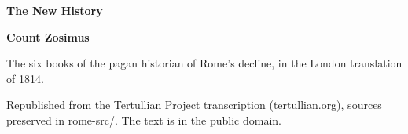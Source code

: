 \documentclass[11pt,letterpaper]{article}
\begin{document}
\color{ink}

\begin{titlepage}
\centering
\vspace*{4em}
{\LARGE\bfseries\color{heading} The New History\par}
\vspace{2em}
{\Large\bfseries\color{heading} Count Zosimus\par}
\vspace{2.5em}
{\itshape\color{subhead}\parbox{0.8\linewidth}{\centering The six books of the pagan historian of Rome's decline, in the London translation of 1814.\par}}
\vfill
{\small Republished from the Tertullian Project transcription (tertullian.org), sources preserved in rome-src/. The text is in the public domain.\par}
\vspace{2em}
\end{titlepage}

\tableofcontents


\end{document}
